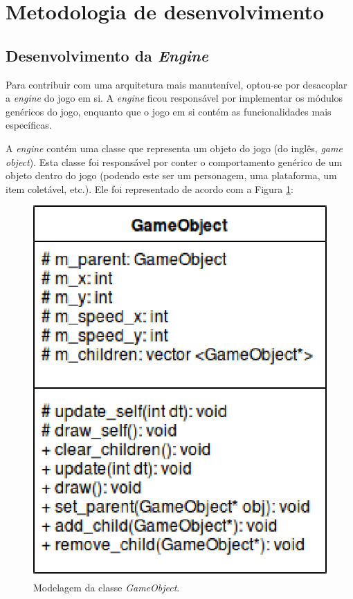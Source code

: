 \section{Metodologia de desenvolvimento} \label{devmet}

  \subsection{Desenvolvimento da \textit{Engine}}

    Para contribuir com uma arquitetura mais manutenível, optou-se por desacoplar a \textit{engine} do jogo em si. A \textit{engine} ficou responsável por implementar os módulos genéricos do jogo, enquanto que o jogo em si contém as funcionalidades mais específicas.

    A \textit{engine} contém uma classe que representa um objeto do jogo (do inglês, \textit{game object}). Esta classe foi responsável por conter o comportamento genérico de um objeto dentro do jogo (podendo este ser um personagem, uma plataforma, um item coletável, etc.). Ele foi representado de acordo com a Figura \ref{game-object}:

    \vspace{\onelineskip}

    \begin{figure}[H]
      \centering \includegraphics[keepaspectratio=true,scale=0.6]{figuras/game-object.eps}
      \caption[Modelagem da classe \textit{GameObject}]
        {Modelagem da classe \textit{GameObject}.}
      \label{game-object}
    \end{figure}

